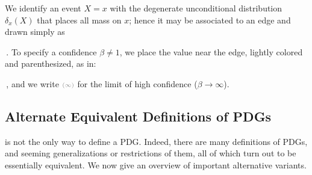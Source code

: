 We identify an event $X\!\!=\!x$ with
the degenerate unconditional distribution $\delta_x(X)$ that places all mass on $x$;
hence it may be associated to an edge and drawn simply as
\,.
To specify a confidence $\beta \ne 1$,
we place the value near the edge, lightly colored and parenthesized, as in:
\!\!\!\!
\,,
and we write ${\scriptstyle\color{gray}(\infty)}$ for the limit of high confidence ($\beta\!\to\! \infty$). %





\subsection{Alternate Equivalent Definitions of PDGs}
    \label{sec:alt-pdgs}

 is not the only way to define a PDG. 
Indeed, there are many definitions of PDGs, and seeming generalizations
or restrictions of them, all of which turn out to be essentially equivalent. 
We now give an overview of important alternative variants.

